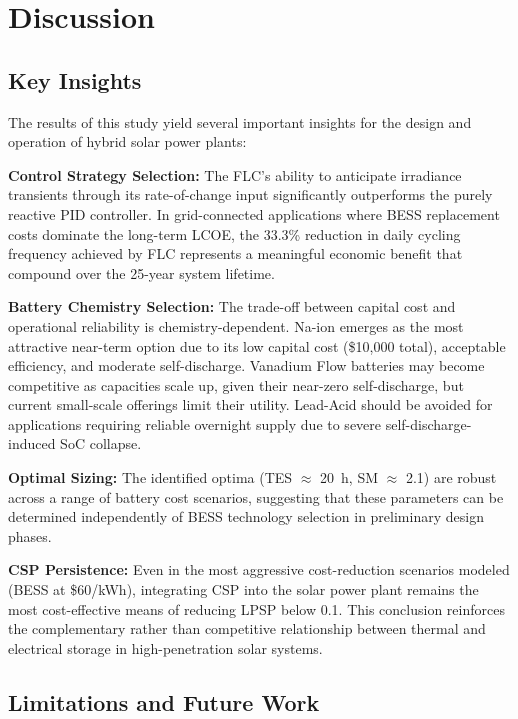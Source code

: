 \documentclass[journal]{IEEEtran}
\begin{document}
\section{Discussion}
\label{sec:discussion}

\subsection{Key Insights}

The results of this study yield several important insights for the design and operation of hybrid solar power plants:

\textbf{Control Strategy Selection:} The FLC's ability to anticipate irradiance transients through its rate-of-change input significantly outperforms the purely reactive PID controller. In grid-connected applications where BESS replacement costs dominate the long-term LCOE, the 33.3\% reduction in daily cycling frequency achieved by FLC represents a meaningful economic benefit that compound over the 25-year system lifetime.

\textbf{Battery Chemistry Selection:} The trade-off between capital cost and operational reliability is chemistry-dependent. Na-ion emerges as the most attractive near-term option due to its low capital cost (\$10,000 total), acceptable efficiency, and moderate self-discharge. Vanadium Flow batteries may become competitive as capacities scale up, given their near-zero self-discharge, but current small-scale offerings limit their utility. Lead-Acid should be avoided for applications requiring reliable overnight supply due to severe self-discharge-induced SoC collapse.

\textbf{Optimal Sizing:} The identified optima (TES $\approx$ 20~h, SM $\approx$ 2.1) are robust across a range of battery cost scenarios, suggesting that these parameters can be determined independently of BESS technology selection in preliminary design phases.

\textbf{CSP Persistence:} Even in the most aggressive cost-reduction scenarios modeled (BESS at \$60/kWh), integrating CSP into the solar power plant remains the most cost-effective means of reducing LPSP below 0.1. This conclusion reinforces the complementary rather than competitive relationship between thermal and electrical storage in high-penetration solar systems.

\subsection{Limitations and Future Work}
\end{document}
